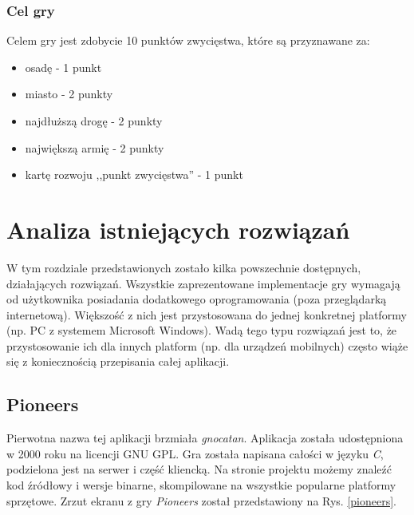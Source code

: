 \documentclass[a4paper,12pt]{article}
\providecommand{\imref}[1]{Rys. \ref{#1}} %
\begin{document}
\subsubsection{Cel gry}
Celem gry jest zdobycie 10 punktów zwycięstwa, które są przyznawane
za:

\begin{itemize}
\item osadę - 1 punkt
\item miasto - 2 punkty
\item najdłuższą drogę - 2 punkty
\item największą armię - 2 punkty
\item kartę rozwoju ,,punkt zwycięstwa'' - 1 punkt
\end{itemize}

\clearpage

\section{Analiza istniejących rozwiązań}
W tym rozdziale przedstawionych zostało kilka powszechnie dostępnych,
działających rozwiązań. Wszystkie zaprezentowane implementacje gry
wymagają od użytkownika posiadania dodatkowego oprogramowania (poza
przeglądarką internetową). Większość z nich jest przystosowana do
jednej konkretnej platformy (np. PC z systemem Microsoft
Windows). Wadą tego typu rozwiązań jest to, że przystosowanie ich dla
innych platform (np. dla urządzeń mobilnych) często wiąże się z
koniecznością przepisania całej aplikacji.

\subsection{Pioneers}
Pierwotna nazwa tej aplikacji brzmiała \emph{gnocatan}. Aplikacja
została udostępniona w 2000 roku na licencji GNU GPL. Gra została
napisana całości w języku \emph{C}, podzielona jest na serwer i część
kliencką. Na stronie projektu \cite{pioneers} możemy znaleźć kod
źródłowy i wersje binarne, skompilowane na wszystkie popularne
platformy sprzętowe. Zrzut ekranu z gry \emph{Pioneers} został
przedstawiony na \imref{pioneers}.
\end{document}
